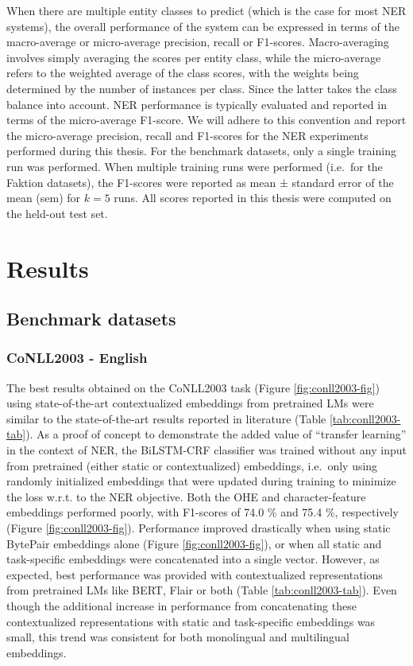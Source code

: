 \documentclass[12pt,a4paper,]{book}
\begin{document}
When there are multiple entity classes to predict (which is the case for most NER systems), the overall performance of the system can be expressed in terms of the macro-average or micro-average precision, recall or F1-scores. Macro-averaging involves simply averaging the scores per entity class, while the micro-average refers to the weighted average of the class scores, with the weights being determined by the number of instances per class. Since the latter takes the class balance into account. NER performance is typically evaluated and reported in terms of the micro-average F1-score. We will adhere to this convention and report the micro-average precision, recall and F1-scores for the NER experiments performed during this thesis. For the benchmark datasets, only a single training run was performed. When multiple training runs were performed (i.e.~for the Faktion datasets), the F1-scores were reported as mean ± standard error of the mean (sem) for \(k = 5\) runs. All scores reported in this thesis were computed on the held-out test set.

\hypertarget{results}{%
\chapter{Results}\label{results}}

\hypertarget{benchmark-datasets-1}{%
\section{Benchmark datasets}\label{benchmark-datasets-1}}

\hypertarget{conll2003---english}{%
\subsection{CoNLL2003 - English}\label{conll2003---english}}

The best results obtained on the CoNLL2003 task (Figure \ref{fig:conll2003-fig}) using state-of-the-art contextualized embeddings from pretrained LMs were similar to the state-of-the-art results reported in literature (Table \ref{tab:conll2003-tab}). As a proof of concept to demonstrate the added value of ``transfer learning'' in the context of NER, the BiLSTM-CRF classifier was trained without any input from pretrained (either static or contextualized) embeddings, i.e.~only using randomly initialized embeddings that were updated during training to minimize the loss w.r.t. to the NER objective. Both the OHE and character-feature embeddings performed poorly, with F1-scores of 74.0 \% and 75.4 \%, respectively (Figure \ref{fig:conll2003-fig}). Performance improved drastically when using static BytePair embeddings alone (Figure \ref{fig:conll2003-fig}), or when all static and task-specific embeddings were concatenated into a single vector. However, as expected, best performance was provided with contextualized representations from pretrained LMs like BERT, Flair or both (Table \ref{tab:conll2003-tab}). Even though the additional increase in performance from concatenating these contextualized representations with static and task-specific embeddings was small, this trend was consistent for both monolingual and multilingual embeddings.
\end{document}
